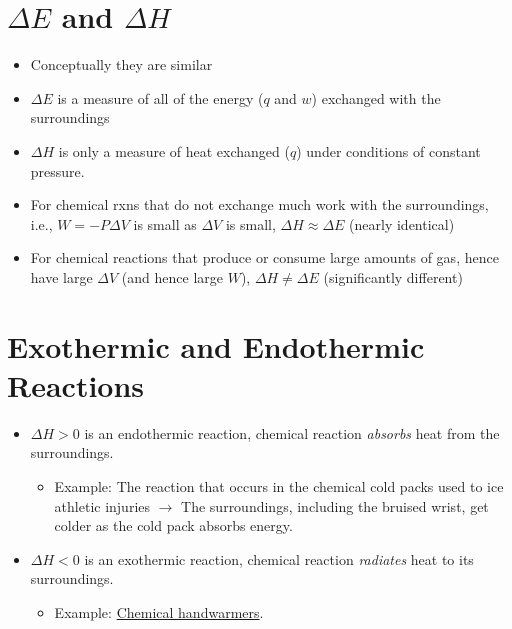 \documentclass[
	chapter=6,
	title={Thermochemistry},
	showanswers=true,
]{chem122notes}
\begin{document}
\section{$\Delta E$ and $\Delta H$}\label{sec:e-and-h}
\begin{itemize}
	\item Conceptually they are similar
	\item $\Delta E$ is a measure of all of the energy ($q$ and $w$) exchanged with the surroundings
	\item $\Delta H$ is only a measure of heat exchanged ($q$) under conditions of constant pressure.
	\item For chemical rxns that do not exchange much work with the surroundings, i.e., $W=-P\Delta V$ is small as $\Delta V$ is small, $\Delta H \approx \Delta E$ (nearly identical)
	\item For chemical reactions that produce or consume large amounts of gas, hence have large $\Delta V$ (and hence large $W$), $\Delta H \neq \Delta E$ (significantly different)
\end{itemize}

\section{Exothermic and Endothermic Reactions}\label{sec:exothermic-and-endothermic-reactions}
\begin{itemize}
	\item $\Delta H > 0$ is an endothermic reaction, chemical reaction \emph{absorbs} heat from the surroundings.
	\begin{itemize}
		\item Example: The reaction that occurs in the chemical cold packs used to ice athletic injuries $\rightarrow$ The surroundings, including the bruised wrist, get colder as the cold pack absorbs energy.
	\end{itemize}
	\item $\Delta H < 0$ is an exothermic reaction, chemical reaction \emph{radiates} heat to its surroundings.
	\begin{itemize}
		\item Example: \hyperref[dfn:chemical-handwarmers]{Chemical handwarmers}.
	\end{itemize}
\end{itemize}
\end{document}
